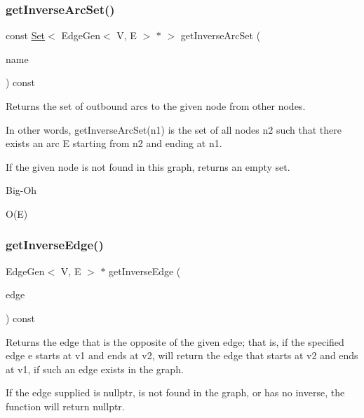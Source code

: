 \subsubsection{\texorpdfstring{get\+Inverse\+Arc\+Set()}{getInverseArcSet()}\hspace{0.1cm}{\footnotesize\ttfamily [2/2]}}
{\footnotesize\ttfamily const \mbox{\hyperlink{classSet}{Set}}$<$ Edge\+Gen$<$ V, E $>$  $\ast$ $>$ get\+Inverse\+Arc\+Set (\begin{DoxyParamCaption}\item[{const std\+::string \&}]{name }\end{DoxyParamCaption}) const\hspace{0.3cm}{\ttfamily [inherited]}}



Returns the set of outbound arcs to the given node from other nodes. 

In other words, get\+Inverse\+Arc\+Set(n1) is the set of all nodes n2 such that there exists an arc E starting from n2 and ending at n1.

If the given node is not found in this graph, returns an empty set. \begin{DoxyRefDesc}{Big-\/\+Oh}
\item[\mbox{\hyperlink{BigOh__BigOh000066}{Big-\/\+Oh}}]O(\+E) \end{DoxyRefDesc}
\mbox{\label{classBasicGraphGen_ae81616e12d12f2dcfa295b4a3b48f960}} 
\subsubsection{\texorpdfstring{get\+Inverse\+Edge()}{getInverseEdge()}}
{\footnotesize\ttfamily Edge\+Gen$<$ V, E $>$ $\ast$ get\+Inverse\+Edge (\begin{DoxyParamCaption}\item[{Edge\+Gen$<$ V, E $>$ $\ast$}]{edge }\end{DoxyParamCaption}) const}



Returns the edge that is the opposite of the given edge; that is, if the specified edge e starts at v1 and ends at v2, will return the edge that starts at v2 and ends at v1, if such an edge exists in the graph. 

If the edge supplied is nullptr, is not found in the graph, or has no inverse, the function will return nullptr.

